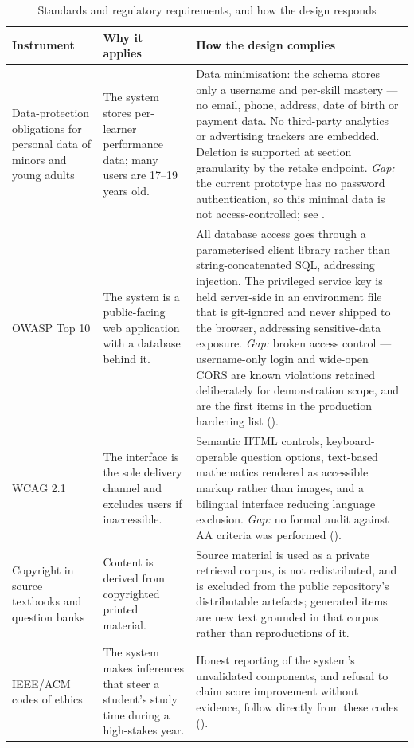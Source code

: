 \begin{table}[htbp]
  \centering
  \caption{Standards and regulatory requirements, and how the design responds}
  \label{tab:standards}
  \begin{tabularx}{\textwidth}{>{\hsize}Y>{\hsize}Y>{\hsize}Y}
    \toprule
    Instrument & Why it applies & How the design complies \\
    \midrule
    Data-protection obligations for personal data of minors and young adults
    \cite{bdda2023} & The system stores per-learner performance data; many users
    are 17--19 years old. & Data minimisation: the schema stores only a username
    and per-skill mastery --- no email, phone, address, date of birth or payment
    data. No third-party analytics or advertising trackers are embedded. Deletion
    is supported at section granularity by the retake endpoint. \emph{Gap:} the
    current prototype has no password authentication, so this minimal data is
    not access-controlled; see . \\
    OWASP Top 10 \cite{owasp2021} & The system is a public-facing web
    application with a database behind it. & All database access goes through a
    parameterised client library rather than string-concatenated SQL, addressing
    injection. The privileged service key is held server-side in an environment
    file that is git-ignored and never shipped to the browser, addressing
    sensitive-data exposure. \emph{Gap:} broken access control --- username-only
    login and wide-open CORS are known violations retained deliberately for
    demonstration scope, and are the first items in the production hardening
    list (). \\
    WCAG 2.1 \cite{wcag21} & The interface is the sole delivery channel and
    excludes users if inaccessible. & Semantic HTML controls, keyboard-operable
    question options, text-based mathematics rendered as accessible markup rather
    than images, and a bilingual interface reducing language exclusion.
    \emph{Gap:} no formal audit against AA criteria was performed
    (). \\
    Copyright in source textbooks and question banks & Content is derived from
    copyrighted printed material. & Source material is used as a private
    retrieval corpus, is not redistributed, and is excluded from the public
    repository's distributable artefacts; generated items are new text grounded
    in that corpus rather than reproductions of it. \\
    IEEE/ACM codes of ethics \cite{ieee2020code,acm2018code} & The system makes
    inferences that steer a student's study time during a high-stakes year. &
    Honest reporting of the system's unvalidated components, and refusal to
    claim score improvement without evidence, follow directly from these codes
    (). \\
    \bottomrule
  \end{tabularx}
\end{table}

